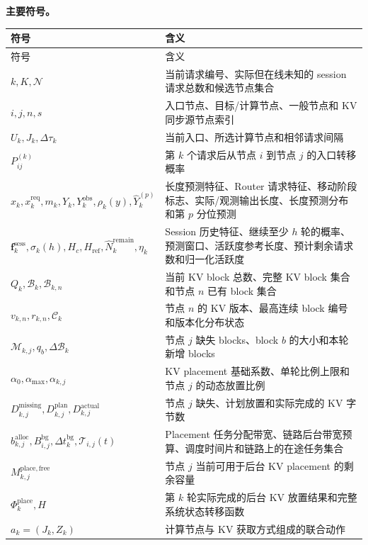 \textbf{主要符号。}
\begingroup
\small
\setlength{\LTpre}{4pt}
\setlength{\LTpost}{6pt}
\begin{longtable}{p{}p{}}
\toprule
符号 & 含义 \\
\midrule
\endfirsthead
\toprule
符号 & 含义 \\
\midrule
\endhead
\(k,K,\mathcal N\) & 当前请求编号、实际但在线未知的 session 请求总数和候选节点集合 \\
\(i,j,n,s\) & 入口节点、目标/计算节点、一般节点和 KV 同步源节点索引 \\
\(U_k,J_k,\Delta\tau_k\) & 当前入口、所选计算节点和相邻请求间隔 \\
\(P_{ij}^{(k)}\) & 第 \(k\) 个请求后从节点 \(i\) 到节点 \(j\) 的入口转移概率 \\
\(x_k,x_k^{\mathrm{req}},m_k,Y_k,Y_k^{\mathrm{obs}},\rho_k(y),\widehat Y_k^{(p)}\) & 长度预测特征、Router 请求特征、移动阶段标志、实际/观测输出长度、长度预测分布和第 \(p\) 分位预测 \\
\(\mathbf f_k^{\mathrm{sess}},\sigma_k(h),H_c,H_{\mathrm{ref}},\widehat N_k^{\mathrm{remain}},\eta_k\) & Session 历史特征、继续至少 \(h\) 轮的概率、预测窗口、活跃度参考长度、预计剩余请求数和归一化活跃度 \\
\(Q_k,\mathcal B_k,\mathcal B_{k,n}\) & 当前 KV block 总数、完整 KV block 集合和节点 \(n\) 已有 block 集合 \\
\(v_{k,n},r_{k,n},\mathcal C_k\) & 节点 \(n\) 的 KV 版本、最高连续 block 编号和版本化分布状态 \\
\(\mathcal M_{k,j},q_b,\Delta\mathcal B_k\) & 节点 \(j\) 缺失 blocks、block \(b\) 的大小和本轮新增 blocks \\
\(\alpha_0,\alpha_{\max},\alpha_{k,j}\) & KV placement 基础系数、单轮比例上限和节点 \(j\) 的动态放置比例 \\
\(D_{k,j}^{\mathrm{missing}},D_{k,j}^{\mathrm{plan}},D_{k,j}^{\mathrm{actual}}\) & 节点 \(j\) 缺失、计划放置和实际完成的 KV 字节数 \\
\(b_{k,j}^{\mathrm{alloc}},B_{i,j}^{\mathrm{bg}},\Delta t_k^{\mathrm{bg}},\mathcal T_{i,j}(t)\) & Placement 任务分配带宽、链路后台带宽预算、调度时间片和链路上的在途任务集合 \\
\(M_{k,j}^{\mathrm{place,free}}\) & 节点 \(j\) 当前可用于后台 KV placement 的剩余容量 \\
\(\Phi_k^{\mathrm{place}},H\) & 第 \(k\) 轮实际完成的后台 KV 放置结果和完整系统状态转移函数 \\
\(a_k=(J_k,Z_k)\) & 计算节点与 KV 获取方式组成的联合动作 \\

\end{longtable}
